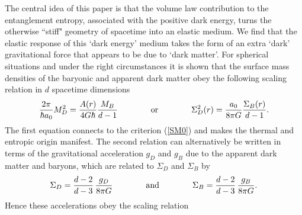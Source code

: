\documentclass[a4paper,12pt]{article}
\newcommand{\be}{\begin{equation}}
\newcommand{\ee}{\end{equation}}
\begin{document}
The central idea of this paper is that the volume law contribution to the entanglement entropy, associated with the positive dark energy, turns the otherwise ``stiff" geometry of spacetime  into an elastic medium. We find that the elastic response of this  `dark energy' medium takes the form of an extra `dark' gravitational force that appears to be due to `dark matter'. For spherical situations and under the right circumstances  it is shown that the surface mass densities of the baryonic and apparent dark matter  obey the following scaling relation in $d$ spacetime dimensions 
\be
\label{TF}
{2\pi \over \hbar a_0} {M_D^2} = {A(r)\over 4G\hbar} {M_B\over d-1} \qquad\qquad\mbox{or}\qquad\qquad \Sigma_D^2(r) ={a_0\over 8\pi G} { \Sigma_B(r)\over d-1}. 
\ee  
The first equation connects to the criterion (\ref{SM0}) and makes the thermal and entropic 
origin manifest. The second relation can alternatively be written in terms of the 
 gravitational acceleration $g_D$ and $g_B$ due to the apparent dark matter and baryons, which are related to $\Sigma_D$ and $\Sigma_B$ by
\begin{equation}
\Sigma_D = {d-2\over d-3}\, {g_D\over 8\pi G} \qquad\qquad \mbox{and}\qquad\qquad \Sigma_B = {d-2\over d-3}\, {g_B\over 8\pi G}.	
\end{equation}
Hence these accelerations obey the scaling relation
\end{document}
